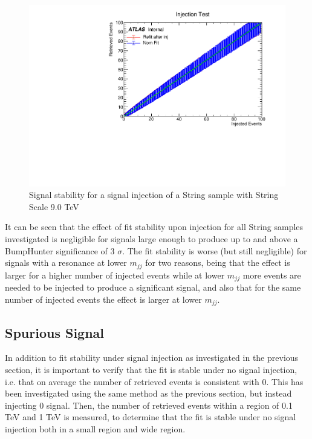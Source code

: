 \begin{figure}
    \centering
    \includegraphics[trim={0cm 0cm 1.6cm 1cm},clip,width=1.0\linewidth]{figures/app-GlobalFitStability/injectionFitStabilityStringScale9000.pdf}
    \caption{Signal stability for a signal injection of a String sample with String Scale 9.0 TeV}
    \label{fig:StringSignalInjectionFitStabilityStudyMs9.0TeV}
\end{figure}

It can be seen that the effect of fit stability upon injection for all String samples investigated is negligible for signals large enough to produce up to and above a BumpHunter significance of 3 $\sigma$. The fit stability is worse (but still negligible) for signals with a resonance at lower $m_{jj}$ for two reasons, being that the effect is larger for a higher number of injected events while at lower $m_{jj}$ more events are needed to be injected to produce a significant signal, and also that for the same number of injected events the effect is larger at lower $m_{jj}$.

\subsection{Spurious Signal}

In addition to fit stability under signal injection as investigated in the previous section, it is important to verify that the fit is stable under no signal injection, i.e. that on average the number of retrieved events is consistent with 0. This has been investigated using the same method as the previous section, but instead injecting 0 signal. Then, the number of retrieved events within a region of 0.1 TeV and 1 TeV is measured, to determine that the fit is stable under no signal injection both in a small region and wide region.

